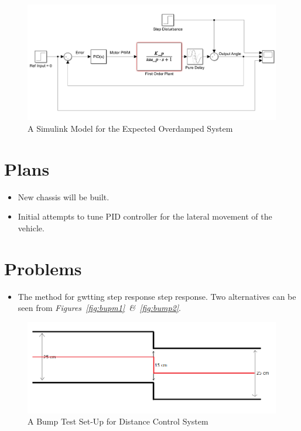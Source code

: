 \documentclass[a4paper,12pt]{article}
\begin{document}
\begin{itemize}
	
	
	
	
		\begin{figure}[H]
			\center
			\setlength{\unitlength}{\textwidth} 
			\includegraphics[width=1\unitlength]{cont}
			\caption{\label{fig:cont} A Simulink Model for the Expected Overdamped System}
		\end{figure}
	
	\end{itemize}
\section{Plans}
\begin{itemize}
\item New chassis will be built.
\item Initial attempts to tune PID controller for the lateral movement of the vehicle.  
\end{itemize}

\section{Problems}
\begin{itemize}
	\item The method for gwtting step response step response. Two alternatives can be seen from \textit{Figures~\ref{fig:bupm1}~\&~\ref{fig:bump2}}.
\end{itemize}


		\begin{figure}[H]
			\center
			\setlength{\unitlength}{\textwidth} 
			\includegraphics[width=1\unitlength]{bump_test_dist}
			\caption{\label{fig:bump1} A Bump Test Set-Up for Distance Control System }
		\end{figure}
		
\end{document}
